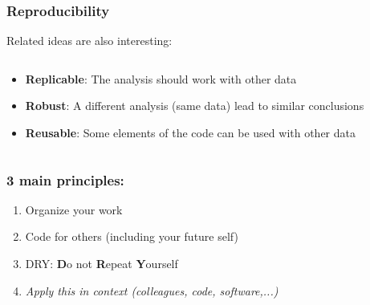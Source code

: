 \documentclass[xcolor=x11names,compress]{beamer}
\renewcommand{\(}{\begin{columns}}
\renewcommand{\)}{\end{columns}}
\newcommand{\<}[1]{\begin{column}{#1}}
\renewcommand{\>}{\end{column}}
\begin{document}
\begin{frame}
\frametitle{Reproducibility}
Related ideas are also interesting: \\
\pause
\begin{columns}[t]
 \begin{column}{0.55\textwidth}
    \begin{itemize}[<+->]
    \item[]\textbf{ Replicable}: The analysis should work with other data
    \item[] \textbf{Robust}:  A different analysis (same data) lead to similar conclusions
    \item[] \textbf{Reusable}: Some elements of the code can be used with other data
    \end{itemize}
\end{column}
  \begin{column}{0.45\textwidth}
    \begin{center}
    \begin{itemize}
    \end{itemize}
    \end{center}
  \end{column}
\end{columns}
\end{frame}


\begin{frame}[<+->]
   \frametitle{3 main principles:}
    \begin{enumerate}
     \item Organize your work
     \item Code for others (including your future self)
     \item DRY: \textbf{D}o not \textbf{R}epeat \textbf{Y}ourself
      \item[]   \begin{alertblock}{}
            \begin{center}
                  \textit{Apply this in context (colleagues, code, software,...)}
            \end{center}
      \end{alertblock}
    \end{enumerate}
\end{frame}
\end{document}

